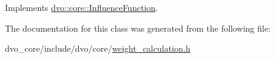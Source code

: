 Implements \mbox{\hyperlink{classdvo_1_1core_1_1_influence_function_a158082c763fa9de460e75a285bb91f1e}{dvo\+::core\+::\+Influence\+Function}}.



The documentation for this class was generated from the following file\+:\begin{DoxyCompactItemize}
\item 
dvo\+\_\+core/include/dvo/core/\mbox{\hyperlink{weight__calculation_8h}{weight\+\_\+calculation.\+h}}\end{DoxyCompactItemize}

